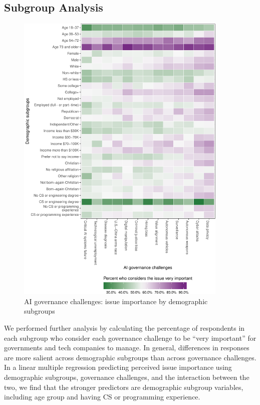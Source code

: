 \documentclass{article}
\begin{document}
\subsection{Subgroup Analysis}

\begin{figure}
\centering
\includegraphics[width=0.90\textwidth]{images/airisksdemo-1.pdf}
\caption{AI governance challenges: issue importance by demographic subgroups}
\label{fig:subgroup}
\end{figure}

We performed further analysis by calculating the percentage of respondents in each subgroup who consider each governance challenge to be ``very important'' for governments and tech companies to manage. In general, differences in responses are more salient across demographic subgroups than across governance challenges. In a linear multiple regression predicting perceived issue importance using demographic subgroups, governance challenges, and the interaction between the two, we find that the stronger predictors are demographic subgroup variables, including age group and having CS or programming experience.
\end{document}
